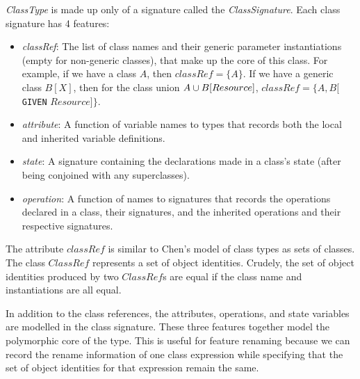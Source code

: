 \vspace{2mm} {\em ClassType} is made up only of a signature called
the {\em ClassSignature}. Each class signature has 4 features:
\begin{itemize}
  \item {\em classRef}: The list of class names and their generic
    parameter instantiations (empty for non-generic classes), that
    make up the core of this class. For example, if we have a class
    $A$, then $classRef = \{ A \}$. If we have a generic class $B[X]$,
    then for the class union $A \classuni B[Resource]$,
    $classRef = \{ A, B[${\tt GIVEN} $Resource]\}$.
  \item {\em attribute}: A function of variable names to types that records
    both the local and inherited variable definitions.
  \item {\em state}: A signature containing the declarations made in a
    class's state (after being conjoined with any superclasses).
  \item {\em operation}: A function of names to signatures that
    records the operations declared in a class, their signatures, and
    the inherited operations and their respective signatures.
\end{itemize}

The attribute $classRef$ is similar to Chen's model of class types as
sets of classes. The class $ClassRef$ represents a set of object
identities. Crudely, the set of object identities produced by two
$ClassRef$s are equal if the class name and instantiations are all
equal.

In addition to the class references, the attributes, operations, and
state variables are modelled in the class signature. These three
features together model the polymorphic core of the type. This is
useful for feature renaming because we can record the rename
information of one class expression while specifying that the set of
object identities for that expression remain the same.

